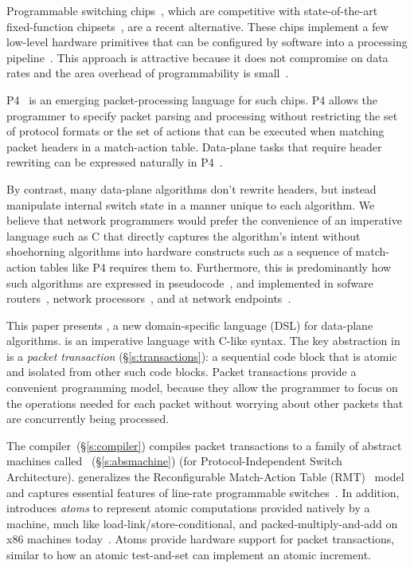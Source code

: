 Programmable switching chips~\cite{flexpipe, xpliant, rmt}, which are
competitive with state-of-the-art fixed-function chipsets~\cite{trident,
tomahawk, mellanox}, are a recent alternative.  These chips implement a few
low-level hardware primitives that can be configured by software into a
processing pipeline~\cite{xpliant_sdk,xpliant_sdk2,intel_sdk}. This approach is
attractive because it does not compromise on data rates and the area overhead
of programmability is small~\cite{rmt}.

P4~\cite{p4, p4spec} is an emerging packet-processing language for
such chips. P4 allows the programmer to specify packet parsing and
processing without restricting the set of protocol formats or the set
of actions that can be executed when matching packet headers in a
match-action table. Data-plane tasks that require header rewriting can
be expressed naturally in P4~\cite{dc_p4}.

By contrast, many data-plane algorithms don't rewrite headers, but instead
manipulate internal switch state in a manner unique to each algorithm. We
believe that network programmers would prefer the convenience of an imperative
language such as C that directly captures the algorithm's intent without
shoehorning algorithms into hardware constructs such as a sequence of
match-action tables like P4 requires them to.  Furthermore, this is
predominantly how such algorithms are expressed in pseudocode~\cite{red, csfq,
codel_code, avq, blue}, and implemented in sofware routers~\cite{click, dpdk,
routebricks}, network processors~\cite{packetc, nova}, and at network
endpoints~\cite{qdisc}.

This paper presents \pktlanguage, a new domain-specific language (DSL) for
data-plane algorithms.  \pktlanguage is an imperative language with C-like
syntax. The key abstraction in \pktlanguage is a {\em packet transaction}
(\S\ref{s:transactions}): a sequential code block that is atomic and isolated
from other such code blocks. Packet transactions provide a convenient
programming model, because they allow the programmer to focus on the operations
needed for each packet without worrying about other packets that are
concurrently being processed.

The \pktlanguage compiler~(\S\ref{s:compiler}) compiles packet transactions to
a family of abstract machines called \absmachine~(\S\ref{s:absmachine}) (for
Protocol-Independent Switch Architecture). \absmachine generalizes the
Reconfigurable Match-Action Table (RMT)~\cite{rmt} model and captures essential
features of line-rate programmable switches~\cite{rmt, xpliant, flexpipe}. In
addition, \absmachine introduces {\em atoms} to represent atomic computations
provided natively by a \absmachine machine, much like
load-link/store-conditional, and packed-multiply-and-add on x86 machines
today~\cite{x86_manual}.  Atoms provide hardware support for packet
transactions, similar to how an atomic test-and-set can implement an atomic
increment.

